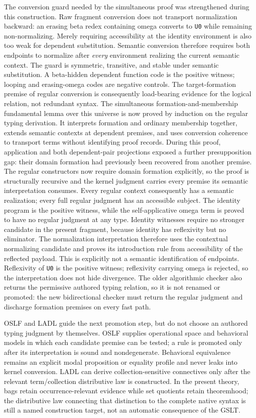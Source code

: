 \documentclass[11pt]{article}
\newcommand{\code}[1]{\texttt{#1}}
\begin{document}
The conversion guard needed by the simultaneous proof was strengthened during
this construction.  Raw fragment conversion does not transport normalization
backward: an erasing beta redex containing omega converts to \code{U0} while
remaining non-normalizing.  Merely requiring accessibility at the identity
environment is also too weak for dependent substitution.  Semantic conversion
therefore requires both endpoints to normalize after \emph{every} environment
realizing the current semantic context.  The guard is symmetric, transitive,
and stable under semantic substitution.  A beta-hidden dependent function code
is the positive witness; looping and erasing-omega codes are negative controls.
The target-formation premise of regular conversion is consequently load-bearing
evidence for the logical relation, not redundant syntax.  The simultaneous
formation-and-membership fundamental lemma over this universe is now proved by
induction on the regular typing derivation.  It interprets formation and ordinary
membership together, extends semantic contexts at dependent premises, and uses
conversion coherence to transport terms without identifying proof records.
During this proof, application and both dependent-pair projections exposed a
further presupposition gap: their domain formation had previously been recovered
from another premise.  The regular constructors now require domain formation
explicitly, so the proof is structurally recursive and the kernel judgment
carries every premise its semantic interpretation consumes.  Every regular
context consequently has a semantic realization; every full regular judgment
has an accessible subject.  The identity program is the positive witness, while
the self-applicative omega term is proved to have no regular judgment at any type.
Identity witnesses require no stronger candidate in the present fragment,
because identity has reflexivity but no eliminator.  The normalization
interpretation therefore uses the contextual normalizing candidate and proves
its introduction rule from accessibility of the reflected payload.  This is
explicitly not a semantic identification of endpoints.  Reflexivity of
\code{U0} is the positive witness; reflexivity carrying omega is rejected, so
the interpretation does not hide divergence.
The older algorithmic checker also returns the
permissive authored typing relation, so it is not renamed or promoted: the new
bidirectional checker must return the regular judgment and discharge formation
premises on every fast path.

OSLF and LADL guide the next promotion step, but do not choose an authored typing
judgment by themselves.  OSLF supplies operational space and behavioral models in
which each candidate premise can be tested; a rule is promoted only after its
interpretation is sound and nondegenerate.  Behavioral equivalence remains an
explicit modal proposition or equality profile and never leaks into kernel
conversion.  LADL can derive collection-sensitive connectives only after the
relevant term/collection distributive law is constructed.  In the present theory,
bags retain occurrence-relevant evidence while set quotients retain theoremhood;
the distributive law connecting that distinction to the complete native syntax is
still a named construction target, not an automatic consequence of the GSLT.
\end{document}
